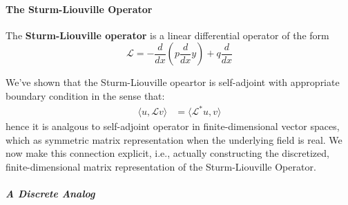 \paragraph{The Sturm-Liouville Operator}

The \textbf{Sturm-Liouville operator} is a linear differential operator of the form
\begin{equation}
\mathcal L=-\frac{d}{dx}\left(p\frac{d}{dx}y\right)+q\frac{d}{dx}
\end{equation}

We've shown that the Sturm-Liouville opeartor is self-adjoint with appropriate boundary condition in the sense that:
\begin{equation}
\begin{aligned}
\langle u, \mathcal Lv \rangle &= \langle \mathcal L^*u, v \rangle
\end{aligned}
\end{equation}
hence it is analgous to self-adjoint operator in finite-dimensional vector spaces, which as symmetric matrix representation when the underlying field is real. We now make this connection explicit, i.e., actually constructing the discretized, finite-dimensional matrix representation of the Sturm-Liouville Operator.

\subparagraph{A Discrete Analog}

